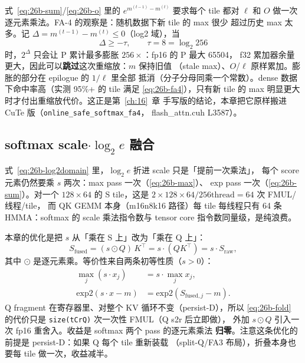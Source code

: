 式~\eqref{eq:26b-sum}/\eqref{eq:26b-o} 里的 $e^{m^{(t-1)}-m^{(t)}}$ 要求每个 tile
都对 $\ell$ 和 $O$ 做一次逐元素乘法。FA-4 的观察是：随机数据下新 tile 的 max 很少
超过历史 max 太多。记 $\Delta = m^{(t-1)} - m^{(t)} \le 0$（log2 域），当
\begin{equation}\label{eq:26b-fa4}
  \Delta \ge -\tau, \qquad \tau = 8 = \log_2 256
\end{equation}
时，$2^{\Delta}$ 只会让 P 累计最多膨胀 $256\times$：fp16 的 P 最大 65504，
f32 累加器余量更大，因此可以\textbf{跳过}这次重缩放：$m$ 保持旧值
（stale max）、$O$/$\ell$ 原样累加。膨胀的部分在 epilogue 的 $1/\ell$ 里全部
抵消（分子分母同乘一个常数）。dense 数据下命中率高（实测 95\%+ 的 tile 满足
\eqref{eq:26b-fa4}），只有新 tile 的 max 明显更大时才付出重缩放代价。这正是第~\ref{ch:16}~章
手写版的结论，本章把它原样搬进 CuTe 版（\texttt{online\_\allowbreak{}safe\_\allowbreak{}softmax\_\allowbreak{}fa4}，
flash\_attn.cuh L3587）。

\subsection{softmax scale$\cdot\log_2 e$ 融合}\label{sec:26b-scale-math}

式~\eqref{eq:26b-log2domain} 里，$\log_2 e$ 折进 scale 只是「提前一次乘法」，
每个 score 元素仍然要乘 $s$ 两次：max pass 一次（\eqref{eq:26b-max}）、
exp pass 一次（\eqref{eq:26b-sum}）。对一个 $128\times 64$ 的 S tile，这是
$2\times 128\times 64 / 256\text{thread} = 64$ 次 FMUL/线程/tile，
而 QK GEMM 本身（m16n8k16 路径）每 tile 每线程只有 64 条 HMMA：softmax 的
scale 乘法指令数与 tensor core 指令数同量级，是纯浪费。

本章的优化是把 $s$ 从「乘在 S 上」改为「乘在 Q 上」：
\begin{equation}\label{eq:26b-fold}
  S_{\text{fused}} = (s\odot Q)\,K^\top = s\cdot(QK^\top) = s\cdot S_{\text{raw}},
\end{equation}
其中 $\odot$ 是逐元素乘。等价性来自两条初等性质（$s>0$）：
\begin{align}
  \max_j (s\cdot x_j) &= s\cdot \max_j x_j, \label{eq:26b-maxcommute}\\
  \mathrm{exp2}(s\cdot x - m) &= \mathrm{exp2}(S_{\text{fused},j} - m). \label{eq:26b-expcommute}
\end{align}
Q fragment 在寄存器里、对整个 KV 循环不变（persist-D），所以
\eqref{eq:26b-fold} 的代价只是 \texttt{size(tCrQ)} 次一次性 FMUL（Q s2r 后立即做），
外加 $s\odot Q$ 引入一次 fp16 重舍入。收益是 softmax 两个 pass 的逐元素乘法
\textbf{归零}。注意这条优化的前提是 persist-D：如果 Q 每个 tile 重新装载
（split-Q/FA3 布局），折叠本身也要每 tile 做一次，收益减半。

